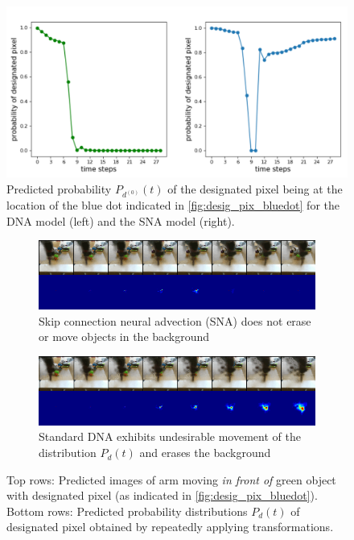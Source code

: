 \begin{figure}[t]
 	\centering
 	\includegraphics[width=0.9\columnwidth]{images_sna/occlusionaware/probability_curves.pdf}
 	\caption{Predicted probability $P_{d^{(0)}}(t)$ of the designated pixel being at the location of the blue dot indicated in \autoref{fig:desig_pix_bluedot} for the DNA model (left) and the SNA model (right). }      \label{fig:pix_reqppear_graph}
 \end{figure}

\begin{figure}
    \centering
    \begin{subfigure}{0.9\columnwidth}
    \centering
        \includegraphics[width=1.\linewidth]{images_sna/occlusionaware/cdna_1ststep_bckgd_gen_pixb0_overtime.png}
        \caption{Skip connection neural advection (SNA) does not erase or move objects in the background}
        \label{fig:Ng1}
    \end{subfigure}
    \begin{subfigure}{0.9\columnwidth}
    \centering
        \includegraphics[width=1.0\linewidth]{images_sna/occlusionaware/orig_dna_gen_pixb0_overtime.png}
        \caption{Standard DNA \cite{foresight} exhibits undesirable movement of the distribution $P_{d}(t)$ and erases the background}
    \end{subfigure}
    \caption{
    Top rows: Predicted images of arm moving \textit{in front of} green object with designated pixel (as indicated in \autoref{fig:desig_pix_bluedot}). 
    Bottom rows: Predicted probability distributions $P_{d}(t)$ of designated pixel obtained by repeatedly applying transformations.}
    \label{fig:pix_reappear}
\end{figure}
